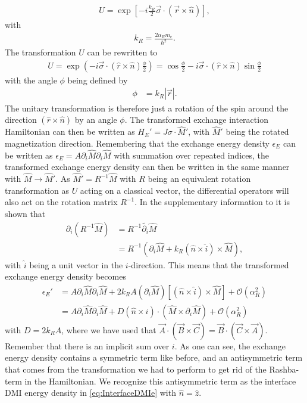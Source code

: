 \documentclass[12pt, a4paper, twoside, openright]{article}		%
\DeclareRobustCommand{\orderof}{\ensuremath{\mathcal{O}}}
\numberwithin{equation}{section}
\begin{document}
\begin{align}
U = \exp{\left[-i \frac{k_R}{2}\vec{\sigma}\cdot(\vec{r}\times\hat{n})\right]},
\end{align}
with
\begin{align}
k_R = \frac{2\alpha_R m_e}{\hbar^2}.
\end{align}
The transformation $U$ can be rewritten to
\begin{align}
U = \exp{\left(-i\vec{\sigma}\cdot(\hat{r}\times\hat{n}) \frac{\phi}{2}\right)} = \cos{\frac{\phi}{2}} - i\vec{\sigma}\cdot(\hat{r}\times\hat{n})\sin{\frac{\phi}{2}}
\end{align}
with the angle $\phi$ being defined by
\begin{align}
\phi &= k_R |\vec{r}|.
\end{align}
The unitary transformation is therefore just a rotation of the spin around the direction $(\hat{r}\times\hat{n})$ by an angle $\phi$. The transformed exchange interaction Hamiltonian can then be written as $H_E' = J\sigma\cdot\hat{M}'$, with $\hat{M}'$ being the rotated magnetization direction. Remembering that the exchange energy density $\epsilon_E$ can be written as $\epsilon_E = A \partial_i \hat{M} \partial_i \hat{M}$ with summation over repeated indices, the transformed exchange energy density can then be written in the same manner with $\hat{M} \rightarrow \hat{M}'$. As $\hat{M}' = R^{-1}\hat{M}$ with $R$ being an equivalent rotation transformation as $U$ acting on a classical vector, the differential operators will also act on the rotation matrix $R^{-1}$. In the supplementary information to \cite{DMIfromRashba_Kim} it is shown that
\begin{align}
\partial_i (R^{-1}\hat{M}) &= R^{-1}\tilde{\partial_i} \hat{M} \\
&= R^{-1} \left(\partial_i\hat{M} + k_R(\hat{n}\times\hat{i})\times\hat{M}\right),
\end{align}
with $\hat{i}$ being a unit vector in the $i$-direction. This means that the transformed exchange energy density becomes
\begin{align}
\nonumber \epsilon_E' &= A\partial_i \hat{M} \partial_i \hat{M} + 2k_RA(\partial_i\hat{M})\left[(\hat{n}\times\hat{i})\times\hat{M}\right] + \orderof(\alpha_R^2) \\
&= A\partial_i \hat{M} \partial_i \hat{M} + D (\hat{n}\times\hat{i}) \cdot (\hat{M}\times\partial_i\hat{M}) + \orderof(\alpha_R^2) \label{eq:exchEnDensDM}
\end{align}
with $D = 2k_RA$, where we have used that $\vec{A}\cdot(\vec{B}\times\vec{C}) = \vec{B}\cdot(\vec{C}\times\vec{A})$. Remember that there is an implicit sum over $i$. As one can see, the exchange energy density contains a symmetric term like before, and an antisymmetric term that comes from the transformation we had to perform to get rid of the Rashba-term in the Hamiltonian. We recognize this antisymmetric term as the interface DMI energy density in \eqref{eq:InterfaceDMIe} with $\hat{n} = \hat{z}$.
\end{document}
